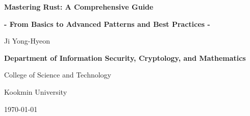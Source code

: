 \documentclass[12pt,openany]{book}
\theoremstyle{definition}
\begin{document}
	
	\begin{titlepage}
		\begin{center}
			{\Huge\textsf{\textbf{Mastering Rust: A Comprehensive Guide}}\par}
			{\Large\textsf{\textbf{- From Basics to Advanced Patterns and Best Practices -}}\par}
			\vspace{0.5in}
			{\Large {Ji Yong-Hyeon}\par}
			\vspace{1in}
			\vspace{1in}
			{\large\bf \textsf{Department of Information Security, Cryptology, and Mathematics}\par}
			{\textsf{College of Science and Technology}\par}
			{\textsf{Kookmin University}\par}
			\vspace{.25in}
			{\large \textsf{\today}\par}
		\end{center}
	\end{titlepage}
	
	\frontmatter
	
%	
	
	\newpage
	\tableofcontents
	
	\newpage
	\mainmatter
%	
%	
	
	\appendix
	
%	
%	
	
	\backmatter
	
\end{document}
